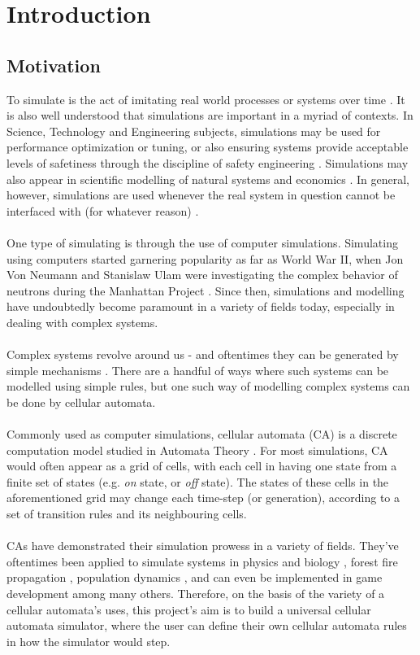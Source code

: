 \chapter{Introduction}
\label{cha:intro}
\section{Motivation}
To simulate is the act of imitating real world processes or systems over time \cite{banks1996discrete}. It is also well understood that simulations are important in a myriad of contexts. In Science, Technology and Engineering subjects, simulations may be used for performance optimization or tuning, \cite{srinivasan2021words} or also ensuring systems provide acceptable levels of safetiness through the discipline of safety engineering \cite{verma2010reliability}. Simulations may also appear in scientific modelling of natural systems and economics \cite{orcutt1960simulation}. In general, however, simulations are used whenever the real system in question cannot be interfaced with (for whatever reason) \cite{srinivasan2021words}. 
\\ \\
One type of simulating is through the use of computer simulations. Simulating using computers started garnering popularity as far as World War II, when Jon Von Neumann and Stanislaw Ulam were investigating the complex behavior of neutrons during the Manhattan Project \cite{robeson}. Since then, simulations and modelling have undoubtedly become paramount in a variety of fields today, especially in dealing with complex systems.
\\ \\
Complex systems revolve around us - and oftentimes they can be generated by simple mechanisms \cite{southwell}. There are a handful of ways where such systems can be modelled using simple rules, but one such way of modelling complex systems can be done by cellular automata.
\\ \\
Commonly used as computer simulations, cellular automata (CA) is a discrete computation model studied in Automata Theory \cite{wolfram}. For  most simulations, CA would often appear as a grid of cells, with each cell in having one state from a finite set of states (e.g. \textit{on} state, or \textit{off} state). The states of these cells in the aforementioned grid may change each time-step (or generation), according to a set of transition rules and its neighbouring cells. 
\\ \\
CAs have demonstrated their simulation prowess in a variety of fields. They've oftentimes been applied to simulate systems in physics and biology \cite{wolfram}, forest fire propagation \cite{freire}, population dynamics \cite{mavroudi} \cite{moreno}, and can even be implemented in game development \cite{kowalski} among many others. Therefore, on the basis of the variety of a cellular automata's uses, this project's aim is to build a universal cellular automata simulator, where the user can define their own cellular automata rules in how the simulator would step. 
